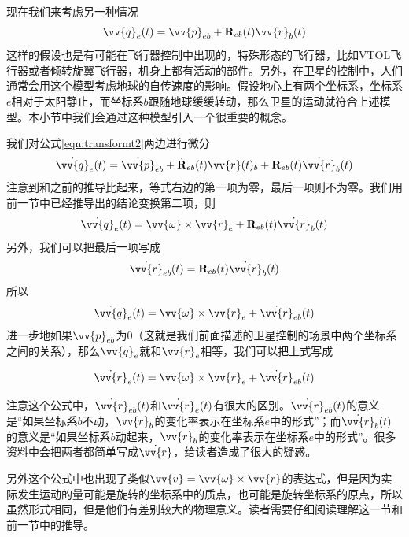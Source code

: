\documentclass[11pt]{article}
\begin{document}
现在我们来考虑另一种情况
\begin{equation}\label{eqn:transformt2}
\vv{q}_{e}(t) = \vv{p}_{eb} + {\bf R}_{eb}(t)\vv{r}_b(t)
\end{equation}
这样的假设也是有可能在飞行器控制中出现的，特殊形态的飞行器，比如VTOL飞行器或者倾转旋翼飞行器，机身上都有活动的部件。另外，在卫星的控制中，人们通常会用这个模型考虑地球的自传速度的影响。假设地心上有两个坐标系，坐标系$e$相对于太阳静止，而坐标系$b$跟随地球缓缓转动，那么卫星的运动就符合上述模型。本小节中我们会通过这种模型引入一个很重要的概念。

我们对公式\ref{eqn:transformt2}两边进行微分
\begin{equation*}
\dot{\vv{q}}_{e}(t) = \dot{ \vv{p}}_{eb} + \dot{{\bf R}}_{eb}(t)\vv{r}(t)_b +{\bf R}_{eb}(t)  \dot{\vv{r}}_b(t)
\end{equation*}
注意到和之前的推导比起来，等式右边的第一项为零，最后一项则不为零。我们用前一节中已经推导出的结论变换第二项，则
\begin{equation*}
\dot{\vv{q}}_{e}(t) = \vv{\omega} \times \vv{r}_e +{\bf R}_{eb}(t)  \dot{\vv{r}}_b(t)
\end{equation*}
另外，我们可以把最后一项写成
$$
\dot{\vv{r}}_{eb}(t) = {\bf R}_{eb}(t)  \dot{\vv{r}}_b(t)
$$
所以
$$
\dot{\vv{q}}_{e}(t) = \vv{\omega} \times \vv{r}_e + \dot{\vv{r}}_{eb}(t)
$$
进一步地如果$\vv{p}_{eb}$为0（这就是我们前面描述的卫星控制的场景中两个坐标系之间的关系），那么$\vv{q}_e$就和$\vv{r}_e$相等，我们可以把上式写成

\begin{equation}\label{eqn:bodyvel}
\dot{\vv{r}}_{e}(t) = \vv{\omega} \times \vv{r}_e + \dot{\vv{r}}_{eb}(t)
\end{equation}

注意这个公式中，$\dot{\vv{r}}_{eb}(t)$和$\dot{\vv{r}}_{e}(t)$有很大的区别。$\dot{\vv{r}}_{eb}(t)$的意义是“如果坐标系$b$不动，$\vv{r}_b$的变化率表示在坐标系$e$中的形式”；而$\dot{\vv{r}}_{b}(t)$的意义是“如果坐标系$b$动起来，$\vv{r}_b$的变化率表示在坐标系$e$中的形式”。很多资料中会把两者都简单写成$\dot{\vv{r}}$，给读者造成了很大的疑惑。

另外这个公式中也出现了类似$\vv{v} = \vv{\omega} \times \vv{r}$的表达式，但是因为实际发生运动的量可能是旋转的坐标系中的质点，也可能是旋转坐标系的原点，所以虽然形式相同，但是他们有差别较大的物理意义。读者需要仔细阅读理解这一节和前一节中的推导。

\ \\
\end{document}
